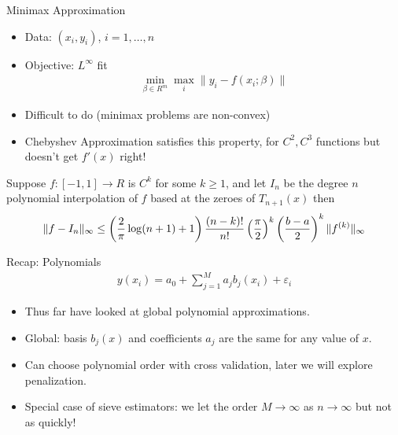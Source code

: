 \documentclass[11pt,handout,xcolor=pdftex,dvipsnames,table,mathserif,aspectratio=169]{beamer}
\begin{document}
\begin{frame}{Minimax Approximation}
\begin{itemize}
\item Data: $(x_i,y_i)$, $i=1,\ldots,n$
\item Objective: $L^{\infty}$ fit
\begin{eqnarray*}
\min_{\beta \in R^m} \max_{i} \| y_i - f(x_i; \beta) \|
\end{eqnarray*}
\item Difficult to do (minimax problems are non-convex)
\item Chebyshev Approximation satisfies this property, for $C^2,C^3$ functions but doesn't get $f'(x)$ right!
\end{itemize}
\begin{theorem}
Suppose $f: [-1,1] \rightarrow R$ is $C^k$ for some $k \geq 1$, and let $I_n$ be the degree $n$ polynomial interpolation of $f$ based at the zeroes of $T_{n+1}(x)$ then
\begin{eqnarray*}
\tiny
\| f - I_n \|_{\infty} \leq \left(\frac{2}{\pi}  \log(n+1) + 1 \right) \frac{(n-k)!}{n!} \left ( \frac{\pi}{2}\right)^k  \left ( \frac{b-a}{2}\right)^k \| f^{(k)} \|_{\infty}
\end{eqnarray*}
\end{theorem}
\end{frame}

\begin{frame}{Recap: Polynomials}
\begin{align*}
y(x_i) = a_0 + \sum_{j=1}^M a_j b_j(x_i) + \varepsilon_i
\end{align*}
\begin{itemize}
\item Thus far have looked at \alert{global polynomial approximations}.
\item Global: basis $b_j(x)$ and coefficients $a_j$ are the same for any value of $x$.
\item Can choose polynomial order with \alert{cross validation}, later we will explore \alert{penalization}.
\item Special case of \alert{sieve estimators}: we let the order $M \rightarrow \infty$ as $n \rightarrow \infty$ but not as quickly!
\end{itemize}
\end{frame}
\end{document}
